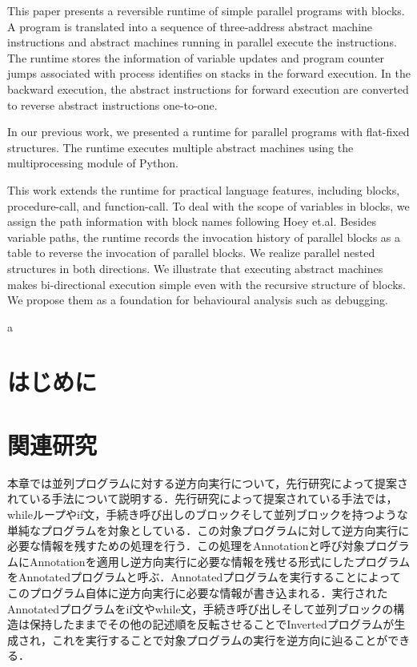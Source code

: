 \documentclass[submit,PRO]{ipsj}
\begin{document}
\begin{eabstract}
This paper presents a reversible runtime of simple parallel programs
with blocks.  A program is translated into a sequence of three-address
abstract machine instructions and abstract machines running in
parallel execute the instructions.  The runtime stores the information
of variable updates and program counter jumps associated with process
identifies on stacks in the forward execution. In the backward
execution, the abstract instructions for forward execution are
converted to reverse abstract instructions one-to-one.

In our previous work, we presented a runtime for parallel programs with
flat-fixed structures.  The runtime executes multiple abstract
machines using the multiprocessing module of Python.

This work extends the runtime for practical language features,
including blocks, procedure-call, and function-call. To deal with the
scope of variables in blocks, we assign the path information with
block names following Hoey et.al.  Besides variable paths, the runtime
records the invocation history of parallel blocks as a table to
reverse the invocation of parallel blocks.  We realize parallel nested
structures in both directions.  We illustrate that executing abstract
machines makes bi-directional execution simple even with the recursive
structure of blocks.  We propose them as a foundation for behavioural
analysis such as debugging.

\end{eabstract}

\begin{ekeyword}
a
\end{ekeyword}

\maketitle

\section{はじめに}


\section{関連研究}

本章では並列プログラムに対する逆方向実行について，先行研究によって提案されている手法について説明する．先行研究によって提案されている手法では，whileループやif文，手続き呼び出しのブロックそして並列ブロックを持つような単純なプログラムを対象としている．この対象プログラムに対して逆方向実行に必要な情報を残すための処理を行う．この処理をAnnotationと呼び対象プログラムにAnnotationを適用し逆方向実行に必要な情報を残せる形式にしたプログラムをAnnotatedプログラムと呼ぶ．Annotatedプログラムを実行することによってこのプログラム自体に逆方向実行に必要な情報が書き込まれる．実行されたAnnotatedプログラムをif文やwhile文，手続き呼び出しそして並列ブロックの構造は保持したままでその他の記述順を反転させることでInvertedプログラムが生成され，これを実行することで対象プログラムの実行を逆方向に辿ることができる．
\end{document}
